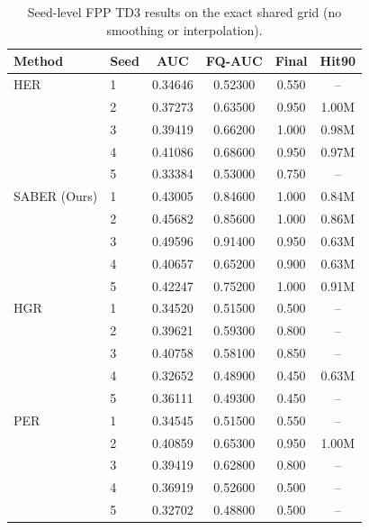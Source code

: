 \begin{table}[t]
\centering
\small
\setlength{\tabcolsep}{1pt}
\begin{tabular}{llcccc}
\toprule
Method & Seed & AUC & FQ-AUC & Final & Hit90 \\
\midrule
HER & 1 & 0.34646 & 0.52300 & 0.550 & -- \\
 & 2 & 0.37273 & 0.63500 & 0.950 & 1.00M \\
 & 3 & 0.39419 & 0.66200 & 1.000 & 0.98M \\
 & 4 & 0.41086 & 0.68600 & 0.950 & 0.97M \\
 & 5 & 0.33384 & 0.53000 & 0.750 & -- \\
\addlinespace[1pt]
SABER (Ours) & 1 & 0.43005 & 0.84600 & 1.000 & 0.84M \\
 & 2 & 0.45682 & 0.85600 & 1.000 & 0.86M \\
 & 3 & 0.49596 & 0.91400 & 0.950 & 0.63M \\
 & 4 & 0.40657 & 0.65200 & 0.900 & 0.63M \\
 & 5 & 0.42247 & 0.75200 & 1.000 & 0.91M \\
\addlinespace[1pt]
HGR & 1 & 0.34520 & 0.51500 & 0.500 & -- \\
 & 2 & 0.39621 & 0.59300 & 0.800 & -- \\
 & 3 & 0.40758 & 0.58100 & 0.850 & -- \\
 & 4 & 0.32652 & 0.48900 & 0.450 & 0.63M \\
 & 5 & 0.36111 & 0.49300 & 0.450 & -- \\
\addlinespace[1pt]
PER & 1 & 0.34545 & 0.51500 & 0.550 & -- \\
 & 2 & 0.40859 & 0.65300 & 0.950 & 1.00M \\
 & 3 & 0.39419 & 0.62800 & 0.800 & -- \\
 & 4 & 0.36919 & 0.52600 & 0.500 & -- \\
 & 5 & 0.32702 & 0.48800 & 0.500 & -- \\
\bottomrule
\end{tabular}
\caption{Seed-level FPP TD3 results on the exact shared grid (no smoothing or interpolation).}
\label{tab:supp-seeds-fpp-td3}
\end{table}
